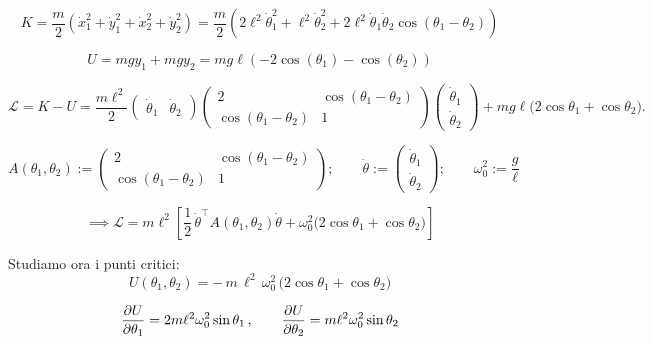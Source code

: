 \begin{equation}
    K = \frac{m}{2}\left( \dot{x}_1^2+\dot{y}_1^2+\dot{x}_2^2+\dot{y}_2^2 \right)= \frac{m}{2}
    \left( 2\ell^2\dot{\theta}_1^2  +\ell^2\dot{\theta}_2^2+2\ell^2\dot{\theta}_1\dot{\theta}_2\cos(\theta_1-\theta_2) \right)
\end{equation}

\begin{equation}
    U = mgy_1+mgy_2= mg\ell\left( -2\cos(\theta_1)-\cos(\theta_2) \right)
\end{equation}

\begin{equation}
\mathcal{L}=K-U
=\frac{m\ell^{2}}{2}
\begin{pmatrix}\dot{\theta}_1&\dot{\theta}_2\end{pmatrix}
\begin{pmatrix}
2 & \cos(\theta_1-\theta_2)\\
\cos(\theta_1-\theta_2) & 1
\end{pmatrix}
\begin{pmatrix}\dot{\theta}_1\\ \dot{\theta}_2\end{pmatrix}
+ m g \ell \big(2\cos\theta_1+\cos\theta_2\big).
\end{equation}

\begin{equation}
A(\theta_1,\theta_2):=
\begin{pmatrix}
2 & \cos(\theta_1-\theta_2)\\
\cos(\theta_1-\theta_2) & 1
\end{pmatrix};\qquad
\dot{\theta}:=
\begin{pmatrix}\dot{\theta}_1\\ \dot{\theta}_2\end{pmatrix};\qquad
\omega_0^2:=\frac{g}{\ell}
\end{equation}

\begin{equation}
\implies\mathcal{L}
= m\ell^{2}\!\left[
\frac{1}{2}\,\dot{\theta}^{\intercal}A(\theta_1,\theta_2)\dot{\theta}
+ \omega_0^2\big(2\cos\theta_1+\cos\theta_2\big)
\right]
\end{equation}

Studiamo ora i punti critici: 
\begin{equation}
U(\theta_1,\theta_2)= -\,m\,\ell^{2}\,\omega_0^{2}\,\big(2\cos\theta_1+\cos\theta_2\big)
\end{equation}

\begin{equation}
\pdv{U}{\theta_1}=2m\ell^{2}\omega_0^{2}\sin\theta_1\,,\qquad
\pdv{U}{\theta_2}=m\ell^{2}\omega_0^{2}\sin\theta_2
\end{equation}

